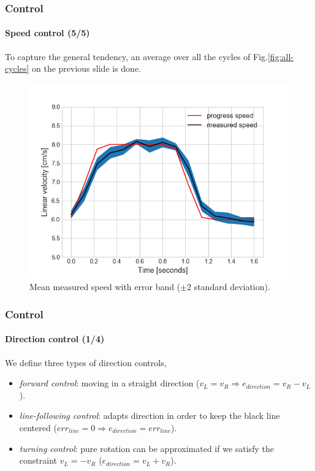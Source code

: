 \documentclass[10pt]{beamer}
\begin{document}
\begin{frame}
\frametitle{Control}
\framesubtitle{Speed control (5/5)}
To capture the general tendency, an average over all the cycles of Fig.\ref{fig:all-cycles} on the previous slide is done. 
\begin{figure}[hbtp]
\centering
\label{fig:average-pid}
\includegraphics[scale=0.45]{figures/pid_speed_shaded.png}
\caption{Mean measured speed with error band ($\pm 2$ standard deviation).}
\end{figure}
\end{frame}


\begin{frame}[label={frame:control-direction}]
\frametitle{Control}
\framesubtitle{Direction control (1/4)}
We define three types of direction controls,
\begin{itemize}
\item \textit{forward control}: moving in a straight direction ($v_L = v_R \Rightarrow e_{direction} = v_R - v_L$).
\item \textit{line-following control}: adapts direction in order to keep the black line centered ($err_{line} = 0 \Rightarrow e_{direction} = err_{line}$).
\item \textit{turning control}: pure rotation can be approximated if we satisfy the constraint  $v_L = -v_R$ ($e_{direction} = v_L + v_R$).
\end{itemize}
\end{frame}

\end{document}
